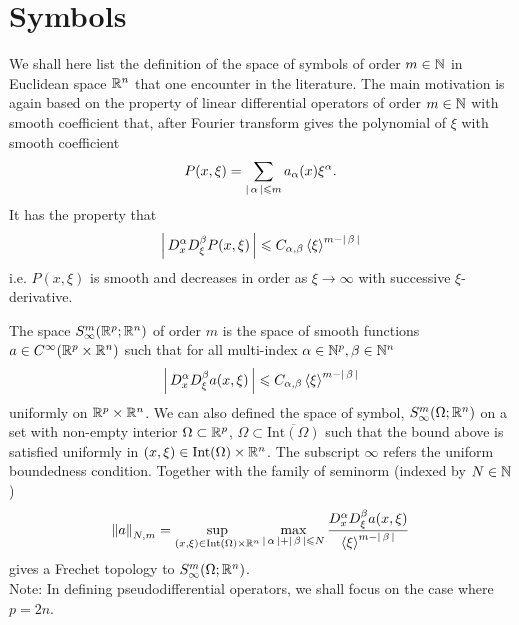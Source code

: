 \documentclass{article}
\begin{document}
\section{Symbols}
We shall here list the definition of the space of symbols of order $m \in \N$  in Euclidean space $\R^n$ that one encounter in the literature. The main motivation is again based on the property of linear differential operators of order $m \in \N$ with smooth coefficient that, after Fourier transform gives the polynomial of $\xi$ with smooth coefficient 
\begin{align*}
P(x, \xi) = \sum_{\abs{\alpha} \leq m} a_\alpha(x) \xi^\alpha. 
\end{align*}
It has the property that 
\begin{align*}
\abs{D^\alpha_x D^\beta_\xi P(x, \xi)} \leq C_{\alpha, \beta} \sym[\xi]^{m - \abs{\beta}} 
\end{align*}
i.e. $P(x, \xi)$ is smooth and decreases in order as $\xi \to \infty$ with successive $\xi$-derivative. 


\begin{fdefinition}
    The space $S^m_\infty(\R^p; \R^n)$ of order $m$ is the space of smooth functions $a \in C^\infty(\R^p \times \R^n)$ such that for all multi-index $\alpha \in \N^p, \beta \in \N^n$
    \begin{align*}
    \abs{D^\alpha_x D^\beta_\xi a (x, \xi)} \leq C_{\alpha, \beta} \sym[\xi]^{m - \abs{\beta}} 
    \end{align*}
    uniformly on $\R^p \times \R^n$. We can also defined the space of symbol, $S^m_\infty(\Omega; \R^n)$ on a set with non-empty interior $\Omega \subset \R^p$, $\Omega \subset \overline{\mathrm{Int}(\Omega)}$ such that the bound above is satisfied uniformly in $(x, \xi) \in \mathrm{Int}(\Omega) \times \R^n$. The subscript $\infty$ refers the uniform boundedness condition. Together with the family of seminorm (indexed by $N \in \N$) 
    \begin{align*}
    \norm[a]_{N, m} = \sup_{(x, \xi) \in \mathrm{Int}(\Omega) \times \R^n} \max_{\abs{\alpha} + \abs{\beta} \leq N} \frac{D^\alpha_x D^\beta_\xi a(x, \xi)}{\sym[\xi]^{m - \abs{\beta}}} 
    \end{align*}
    gives a Frechet topology to $S^m_\infty(\Omega; \R^n)$. \\
    
    Note: In defining pseudodifferential operators, we shall focus on the case where $p = 2n$.
\end{fdefinition}
\end{document}
